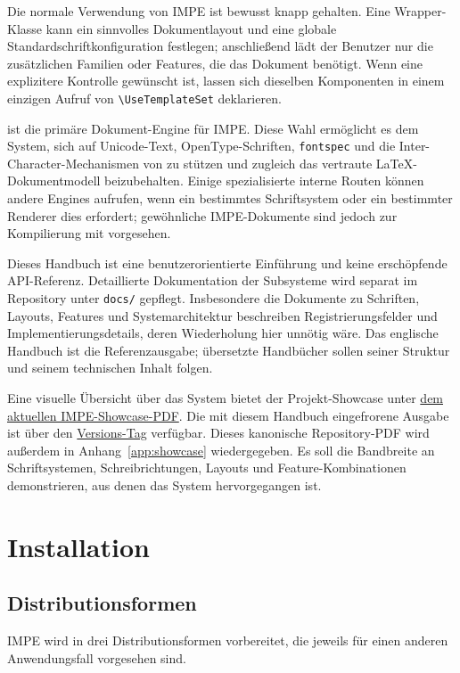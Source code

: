\documentclass[11pt]{impeart}
\newcommand{\IMPEShowcaseURL}{https://github.com/KelvinYangBK67/IMPE-LaTeX-System/blob/main/_showcase/main.pdf}
\newcommand{\IMPETaggedShowcaseURL}{https://github.com/KelvinYangBK67/IMPE-LaTeX-System/blob/v\IMPEVersion/_showcase/main.pdf}
\begin{document}
Die normale Verwendung von IMPE ist bewusst knapp gehalten. Eine Wrapper-Klasse
kann ein sinnvolles Dokumentlayout und eine globale Standardschriftkonfiguration
festlegen; anschließend lädt der Benutzer nur die zusätzlichen Familien oder
Features, die das Dokument benötigt. Wenn eine explizitere Kontrolle gewünscht
ist, lassen sich dieselben Komponenten in einem einzigen Aufruf von
\verb|\UseTemplateSet| deklarieren.

\XeLaTeX{} ist die primäre Dokument-Engine für IMPE. Diese Wahl ermöglicht es
dem System, sich auf Unicode-Text, OpenType-Schriften, \texttt{fontspec} und die
Inter-Character-Mechanismen von \XeTeX{} zu stützen und zugleich das vertraute
\LaTeX{}-Dokumentmodell beizubehalten. Einige spezialisierte interne Routen
können andere Engines aufrufen, wenn ein bestimmtes Schriftsystem oder ein
bestimmter Renderer dies erfordert; gewöhnliche IMPE-Dokumente sind jedoch zur
Kompilierung mit \XeLaTeX{} vorgesehen.

Dieses Handbuch ist eine benutzerorientierte Einführung und keine erschöpfende
API-Referenz. Detaillierte Dokumentation der Subsysteme wird separat im
Repository unter \texttt{docs/} gepflegt. Insbesondere die Dokumente zu
Schriften, Layouts, Features und Systemarchitektur beschreiben
Registrierungsfelder und Implementierungsdetails, deren Wiederholung hier
unnötig wäre. Das englische Handbuch ist die Referenzausgabe; übersetzte
Handbücher sollen seiner Struktur und seinem technischen Inhalt folgen.

Eine visuelle Übersicht über das System bietet der Projekt-Showcase unter
\href{\IMPEShowcaseURL}{dem aktuellen IMPE-Showcase-PDF}. Die mit diesem
Handbuch eingefrorene Ausgabe ist über den
\href{\IMPETaggedShowcaseURL}{Versions-Tag} verfügbar. Dieses kanonische
Repository-PDF wird außerdem in Anhang~\ref{app:showcase} wiedergegeben. Es soll
die Bandbreite an Schriftsystemen, Schreibrichtungen, Layouts und
Feature-Kombinationen demonstrieren, aus denen das System hervorgegangen ist.

\section{Installation}

\subsection{Distributionsformen}

IMPE wird in drei Distributionsformen vorbereitet, die jeweils für einen
anderen Anwendungsfall vorgesehen sind.
\end{document}
